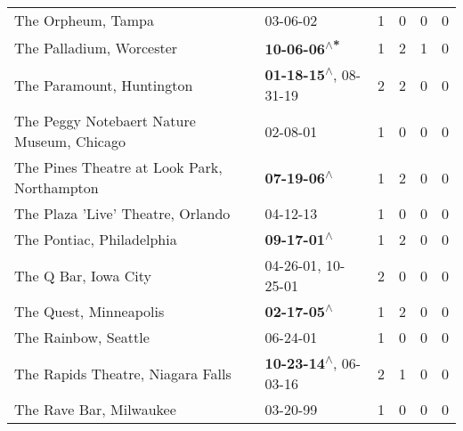 \begin{supertabular}{p{0.4\textwidth}p{0.3\textwidth}p{0.05\textwidth}p{0.05\textwidth}p{0.05\textwidth}p{0.05\textwidth}}
                                                           The Orpheum, Tampa &                                                                  03-06-02\textsuperscript{} &  1 &  0 &  0 &  0 \\
                                                     The Palladium, Worcester &                                                \textbf{10-06-06\textsuperscript{$\wedge$*}} &  1 &  2 &  1 &  0 \\
                                                    The Paramount, Huntington &                     \textbf{01-18-15\textsuperscript{$\wedge$}}, 08-31-19\textsuperscript{} &  2 &  2 &  0 &  0 \\
                                   The Peggy Notebaert Nature Museum, Chicago &                                                                  02-08-01\textsuperscript{} &  1 &  0 &  0 &  0 \\
                                  The Pines Theatre at Look Park, Northampton &                                                 \textbf{07-19-06\textsuperscript{$\wedge$}} &  1 &  2 &  0 &  0 \\
                                            The Plaza 'Live' Theatre, Orlando &                                                                  04-12-13\textsuperscript{} &  1 &  0 &  0 &  0 \\
                                                    The Pontiac, Philadelphia &                                                 \textbf{09-17-01\textsuperscript{$\wedge$}} &  1 &  2 &  0 &  0 \\
                                                         The Q Bar, Iowa City &                                      04-26-01\textsuperscript{}, 10-25-01\textsuperscript{} &  2 &  0 &  0 &  0 \\
                                                       The Quest, Minneapolis &                                                 \textbf{02-17-05\textsuperscript{$\wedge$}} &  1 &  2 &  0 &  0 \\
                                                         The Rainbow, Seattle &                                                                  06-24-01\textsuperscript{} &  1 &  0 &  0 &  0 \\
                                            The Rapids Theatre, Niagara Falls &                     \textbf{10-23-14\textsuperscript{$\wedge$}}, 06-03-16\textsuperscript{} &  2 &  1 &  0 &  0 \\
                                                      The Rave Bar, Milwaukee &                                                                  03-20-99\textsuperscript{} &  1 &  0 &  0 &  0 \\

\end{supertabular}
